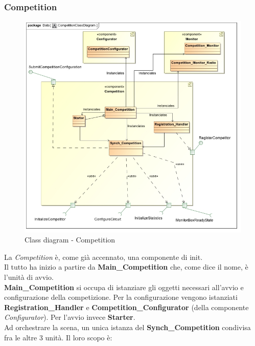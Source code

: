 \subsubsection{Competition}
\begin{center}
\begin{figure}[h!]
	\includegraphics[scale=0.50]{img/ClassDiagrams/CompetitionClassDiagram.jpg}
\caption{Class diagram - Competition}
\end{figure}
\end{center}
La \emph{Competition} \`{e}, come gi\`{a} accennato, una componente di init.\\
Il tutto ha inizio a partire da \textbf{Main\_Competition} che, come dice il nome, \`{e} l'unit\`{a} di avvio.\\
\textbf{Main\_Competition} si occupa di istanziare gli oggetti necessari all'avvio e configurazione della competizione. Per la configurazione
vengono istanziati \textbf{Registration\_Handler} e \textbf{Competition\_Configurator} (della componente \emph{Configurator}).
Per l'avvio invece \textbf{Starter}. \\
Ad orchestrare la scena, un unica istanza del \textbf{Synch\_Competition} condivisa fra le altre 3 unit\`{a}. Il loro scopo \`{e}:
